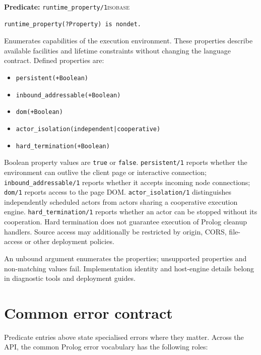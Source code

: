 \noindent \textbf{Predicate:} \texttt{runtime\_\allowbreak{}property/\allowbreak{}1}\hfill\textsc{isobase}

\begin{verbatim}
runtime_property(?Property) is nondet.
\end{verbatim}

\noindent Enumerates capabilities of the execution environment. These
properties describe available facilities and lifetime constraints without
changing the language contract. Defined properties are:

\begin{itemize}
\item \texttt{persistent(+Boolean)}
\item \texttt{inbound\_\allowbreak{}addressable(\allowbreak{}+Boolean)}
\item \texttt{dom(+Boolean)}
\item \texttt{actor\_\allowbreak{}isolation(\allowbreak{}independent|cooperative)}
\item \texttt{hard\_\allowbreak{}termination(\allowbreak{}+Boolean)}
\end{itemize}

\noindent Boolean property values are \texttt{true} or \texttt{false}.
\texttt{persistent/1} reports whether the environment can outlive the client
page or interactive connection; \texttt{inbound\_\allowbreak{}addressable/1} reports whether
it accepts incoming node connections; \texttt{dom/1} reports access to the
page DOM. \texttt{actor\_\allowbreak{}isolation/1} distinguishes independently scheduled
actors from actors sharing a cooperative execution engine.
\texttt{hard\_\allowbreak{}termination/1} reports whether an actor can be stopped without
its cooperation. Hard termination does not guarantee execution of Prolog
cleanup handlers. Source access may additionally be restricted by origin,
CORS, file-access or other deployment policies.

An unbound argument enumerates the properties; unsupported properties and
non-matching values fail. Implementation identity and host-engine details
belong in diagnostic tools and deployment guides.

\section{Common error contract}\label{sec:manual-errors}
Predicate entries above state specialised errors where they matter.  Across
the API, the common Prolog error vocabulary has the following roles:


